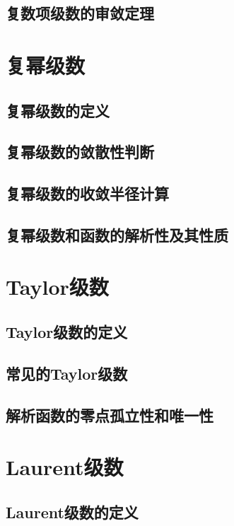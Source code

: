 \documentclass[lang=cn, titlestyle=display, scheme=chinese]{elegantbook}
\begin{document}
            \subsection{复数项级数的审敛定理}

        \section{复幂级数}
            \subsection{复幂级数的定义}

            \subsection{复幂级数的敛散性判断}

            \subsection{复幂级数的收敛半径计算}

            \subsection{复幂级数和函数的解析性及其性质}

        \section{Taylor级数}
            \subsection{Taylor级数的定义}

            \subsection{常见的Taylor级数}

            \subsection{解析函数的零点孤立性和唯一性}

        \section{Laurent级数}
            \subsection{Laurent级数的定义}
\end{document}
